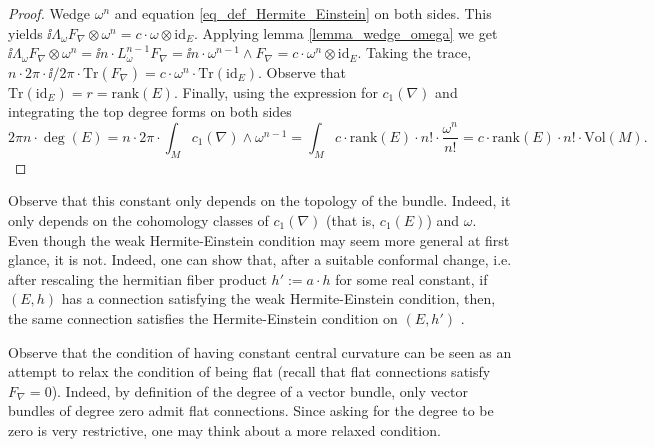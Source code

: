 \begin{proof}
    Wedge \(\omega^n\) and equation \eqref{eq_def_Hermite_Einstein} on both sides. This yields \(\ii \Lambda_\omega F_\nabla \otimes \omega^n=c\cdot \omega \otimes \mathrm{id}_E\). Applying lemma \ref{lemma_wedge_omega} we get \(\ii \Lambda_\omega F_\nabla\otimes \omega^n=\ii n \cdot L_\omega^{n-1} F_\nabla=\ii n \cdot \omega^{n-1}\wedge F_\nabla=c\cdot \omega^n \otimes \mathrm{id}_E\). Taking the trace, \(n \cdot 2\pi\cdot \ii/2 \pi \cdot \mathrm{Tr}(F_\nabla)=c\cdot \omega^n \cdot \mathrm{Tr}(\mathrm{id}_E)\). Observe that \(\mathrm{Tr}(\mathrm{id}_E)=r=\mathrm{rank}(E)\). Finally, using the expression for \(c_1(\nabla)\) and integrating the top degree forms on both sides
    \[
    2\pi n\cdot \deg(E)= n\cdot 2\pi \cdot \int_M c_1(\nabla)\wedge \omega^{n-1} = \int_M c\cdot \mathrm{rank}(E) \cdot n!\cdot  \frac{\omega^n}{n!}=c\cdot \mathrm{rank}(E)\cdot n!\cdot \mathrm{Vol}(M). 
    \]
\end{proof}
Observe that this constant only depends on the topology of the bundle. Indeed, it only depends on the cohomology classes of \(c_1(\nabla)\) (that is, \(c_1(E)\)) and \(\omega\).\\

Even though the weak Hermite-Einstein condition may seem more general at first glance, it is not. Indeed, one can show that, after a suitable conformal change, i.e. after rescaling the hermitian fiber product \(h':=a\cdot h\) for some real constant, if \((E,h)\) has a connection satisfying the weak Hermite-Einstein condition, then, the same connection satisfies the Hermite-Einstein condition on \((E,h')\) \parencite[Prop. 4.2.4]{kobayashi_complex_vector_bundles}.

\begin{obs}
    Observe that the condition of having constant central curvature can be seen as an attempt to relax the condition of being flat (recall that flat connections satisfy \(F_\nabla=0\)). Indeed, by definition of the degree of a vector bundle, only vector bundles of degree zero admit flat connections. Since asking for the degree to be zero is very restrictive, one may think about a more relaxed condition. 
\end{obs}

